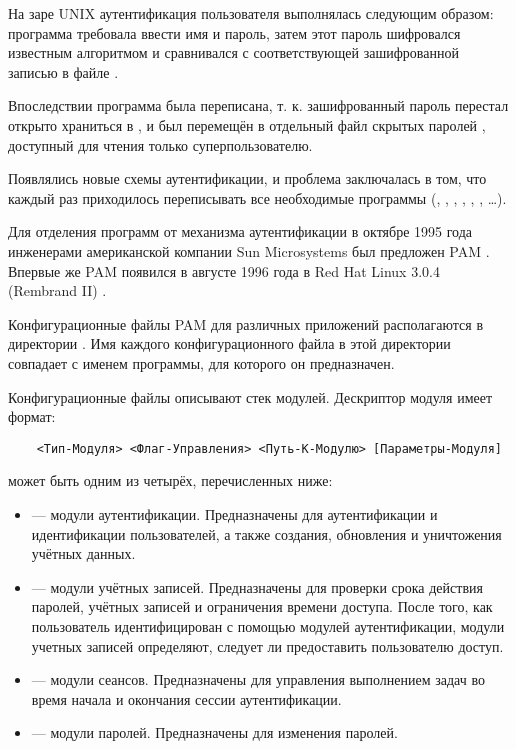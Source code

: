 На заре UNIX аутентификация пользователя выполнялась следующим образом: программа  требовала ввести имя и пароль, затем этот пароль шифровался известным алгоритмом и сравнивался с соответствующей зашифрованной записью в файле .

Впоследствии программа  была переписана, т. к. зашифрованный пароль перестал открыто храниться в , и был перемещён в отдельный файл скрытых паролей , доступный для чтения только суперпользователю.

Появлялись новые схемы аутентификации, и проблема заключалась в том, что каждый раз приходилось переписывать все необходимые программы (, , , , , , \ldots).

Для отделения программ от механизма аутентификации в октябре 1995 года инженерами американской компании Sun Microsystems был предложен PAM \cite{rfc-86.0}. Впервые же PAM появился в августе 1996 года в Red Hat Linux 3.0.4 (Rembrand II) \cite{red-hat-linux-3.0.4}.

Конфигурационные файлы PAM для различных приложений располагаются в директории .
Имя каждого конфигурационного файла в этой директории совпадает с именем программы, для которого он предназначен.

Конфигурационные файлы описывают стек модулей.
Дескриптор модуля имеет формат:
\begin{verbatim}
	<Тип-Модуля> <Флаг-Управления> <Путь-К-Модулю> [Параметры-Модуля]
\end{verbatim}

 может быть одним из четырёх, перечисленных ниже:
\begin{itemize}
	\item {} — модули аутентификации.
	Предназначены для аутентификации и идентификации пользователей, а также создания, обновления и уничтожения учётных данных.
	\item {} — модули учётных записей.
	Предназначены для проверки срока действия паролей, учётных записей и ограничения времени доступа.
	После того, как пользователь идентифицирован с помощью модулей аутентификации, модули учетных записей определяют, следует ли предоставить пользователю доступ.
	\item {} — модули сеансов.
	Предназначены для управления выполнением задач во время начала и окончания сессии аутентификации.
	\item {} — модули паролей.
	Предназначены для изменения паролей.
\end{itemize}

